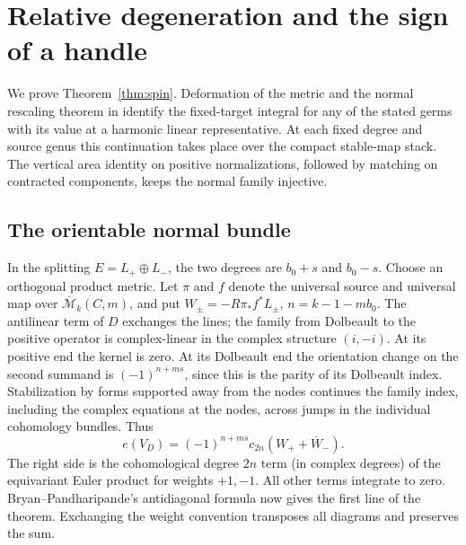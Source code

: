 \section{Relative degeneration and the sign of a handle}\label{app:spinproof}

We prove Theorem~\ref{thm:spin}. Deformation of the metric and the
normal rescaling theorem in \cite[Proposition~15.4 and Appendices~D--E]{WueUnramified} identify the
fixed-target integral for any of the stated germs with its value at a
harmonic linear representative. At each fixed degree and source genus
this continuation takes place over the compact stable-map stack. The
vertical area identity on positive normalizations, followed by
matching on contracted components, keeps the normal family injective.

\subsection{The orientable normal bundle}
In the splitting \(E=L_+\oplus L_-\), the two degrees are
\(b_0+s\) and \(b_0-s\). Choose an orthogonal product metric.
Let \(\pi\) and \(f\) denote the universal source and universal map
over \(\overline{\mathcal M}_k(C,m)\), and put \(W_\pm=-R\pi_*f^*L_\pm\),
\(n=k-1-mb_0\). The antilinear term of \(D\) exchanges the lines;
the family from Dolbeault to the positive operator is complex-linear
in the complex structure \((i,-i)\). At its positive end the kernel is
zero. At its Dolbeault end the orientation change on the second
summand is \((-1)^{n+ms}\), since this is the parity of its
Dolbeault index. Stabilization by forms supported away from the nodes
continues the family index, including the complex equations at the
nodes, across jumps in the individual cohomology bundles. Thus
\begin{equation}\label{eq:oriented}
 e(V_D)=(-1)^{n+ms}c_{2n}(W_++\overline W_-).
\end{equation}
The right side is the cohomological degree \(2n\) term (in complex
degrees) of the equivariant Euler product for weights \(+1,-1\).
All other terms integrate to zero. Bryan--Pandharipande's
antidiagonal formula \cite[Corollary~7.2]{bp08} now gives the first
line of the theorem. Exchanging the weight convention transposes all
diagrams and preserves the sum.

